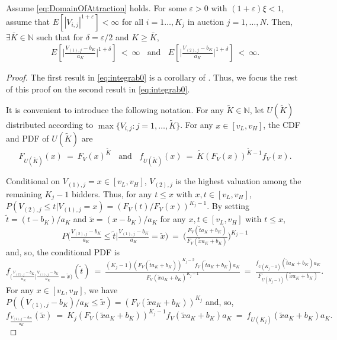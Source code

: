 \begin{lemma}\label{lem:finite_muK2}
Assume \eqref{eq:DomainOfAttraction} holds. For some $\varepsilon>0$ with $(1+\varepsilon)\xi<1$, assume that $E[ |V_{i,j}|^{1+\varepsilon}] <\infty $ for all $i=1\dots,K_j$ in auction $j=1,\dots,N$. Then, $\exists \bar{K} \in \mathbb{N}$ such that for $\delta = \varepsilon/2$ and $K \geq \bar{K}$,
\begin{align}
E[ \vert \tfrac{V_{(1),j}-b_{K}}{a_{K}} \vert^{1+\delta} ] ~<~\infty~~~~\text{and}~~~~
E[ \vert \tfrac{V_{(2),j}-b_{K}}{a_{K}} \vert^{1+\delta} ] ~<~\infty .  \label{eq:integrab0}
\end{align}
\end{lemma}
\begin{proof}
The first result in \eqref{eq:integrab0} is a corollary of \citet[Theorem 5.3.1]{dehaan2006book}. Thus, we focus the rest of this proof on the second result in \eqref{eq:integrab0}.

It is convenient to introduce the following notation. For any $\tilde{K}\in \mathbb{N} $, let $U({\tilde{K}})$ distributed according to $\max\{V_{i,j}:j=1,\dots,\tilde{K}\}$. For any $x\in [ v_{L},v_{H}] $, the CDF and PDF of $U({\tilde{K}})$ are
\begin{equation}
F_{U{(\tilde{K})}}( x) ~=~F_{V}(x) ^{ \tilde{K}}~~~~\text{and}~~~~f_{U({\tilde{K}})}( x) ~=~ \tilde{K}( F_{V}(x)) ^{\tilde{K}-1}f_{V}( x) . \label{eq:integrab1}
\end{equation}

Conditional on $V_{(1),j}=x\in [ v_{L},v_{H}] $, $V_{(2),j}$ is the highest valuation among the remaining $K_{j}-1$ bidders. Thus, for any $ t\leq x$ with $x,t\in [ v_{L},v_{H}] $, $P( V_{(2),j}\leq t|V_{(1),j}=x) =( F_{V}(t)/F_{V}(x)) ^{K_{j}-1}$. By setting $\tilde{t}=( t-b_{K}) /a_{K}$ and $\tilde{x}=( x-b_{K}) /a_{K}$ for any $x,t\in [ v_{L},v_{H}] $ with $t\leq x$,
\begin{equation*}
P\Big( \tfrac{V_{(2),j}-b_{K}}{a_{K}}\leq \tilde{t}\Big|\tfrac{V_{(1),j}-b_{K}}{ a_{K}}=\tilde{x}\Big) ~=~\Big( \tfrac{F_{V}(\tilde{t}a_{K}+b_{K})}{F_{V}( \tilde{x}a_{K}+b_{K})}\Big) ^{K_{j}-1}
\end{equation*}
and, so, the conditional PDF is
\begin{equation}
f_{\Big(\tfrac{V_{(2),j}-b_{K}}{a_{K}}\Big|\tfrac{V_{(1),j}-b_{K}}{a_{K}}=\tilde{x}\Big)}( \tilde{t})~=~\tfrac{( K_{j}-1) ( F_{V}(\tilde{t} a_{K}+b_{K})) ^{K_{j}-2}f_{V}(\tilde{t}a_{K}+b_{K})a_{K}}{F_{V}( \tilde{x}a_{K}+b_{K}) ^{K_{j}-1}}~=~\tfrac{f_{U(K_{j}-1)}( \tilde{t}a_{K}+b_{K}) a_{K}}{F_{U(K_{j}-1)}( \tilde{x}a_{K}+b_{K}) }. \label{eq:integrab2}
\end{equation}
For any $x\in [ v_{L},v_{H}] $, we have $P( ({V_{(1),j}-b_{K}})/{a_{K}}\leq \tilde{x}) =( F_{V}( \tilde{x}a_{K}+b_{K})) ^{K_{j}}$ and, so,
\begin{equation}
f_{\tfrac{V_{(1),j}-b_{K}}{a_{K}}}( \tilde{x}) ~=~K_{j}( F_{V}( \tilde{x}a_{K}+b_{K})) ^{K_{j}-1}f_{V}(\tilde{x} a_{K}+b_{K})a_{K}~=~f_{U(K_{j})}( \tilde{x} a_{K}+b_{K}) a_{K}. \label{eq:integrab3}
\end{equation}


\end{proof}
